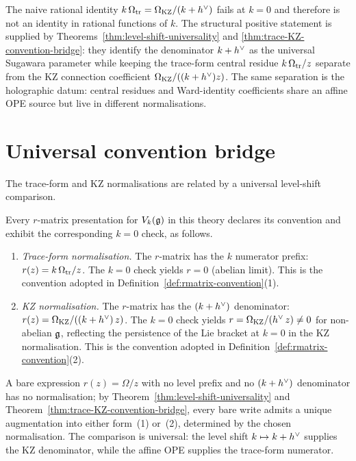 \begin{remark}
\label{rem:chern-weil-474}
The naive rational identity
$k\,\Omega_{\mathrm{tr}} = \Omega_{\mathrm{KZ}}/(k + h^{\vee})$ fails at $k = 0$ and therefore is
not an identity in rational functions of $k$. The structural positive
statement is supplied by
Theorems~\ref{thm:level-shift-universality} and
\ref{thm:trace-KZ-convention-bridge}: they identify the denominator
$k + h^{\vee}$ as the universal Sugawara parameter while keeping the
trace-form central residue $k\,\Omega_{\mathrm{tr}}/z$ separate from the KZ
connection coefficient $\Omega_{\mathrm{KZ}}/((k+h^{\vee})z)$. The same separation is
the holographic datum: central residues and Ward-identity coefficients
share an affine OPE source but live in different normalisations.
\end{remark}

\section{Universal convention bridge}
\label{sec:level-shift-convention-bridge}

The trace-form and KZ normalisations are related by a universal
level-shift comparison.

\begin{corollary}[$r$-matrix convention bridge with explicit $k=0$ check]
\label{cor:level-shift-universal-convention-bridge}
\ClaimStatusProvedHere
Every $r$-matrix presentation for $V_k(\mathfrak{g})$ in this theory declares
its convention and exhibit the corresponding $k = 0$ check, as follows.
\begin{enumerate}
 \item \emph{Trace-form normalisation.} The $r$-matrix has the
 $k$ numerator prefix:
 $r(z) = k\,\Omega_{\mathrm{tr}} / z$. The $k = 0$ check yields $r = 0$
 (abelian limit). This is the convention adopted in
 Definition~\ref{def:rmatrix-convention}(1).
 \item \emph{KZ normalisation.} The $r$-matrix has the
 $(k + h^{\vee})$ denominator:
 $r(z) = \Omega_{\mathrm{KZ}} / ((k + h^{\vee})\,z)$. The $k = 0$ check yields
 $r = \Omega_{\mathrm{KZ}} / (h^{\vee}\,z) \neq 0$ for non-abelian $\mathfrak{g}$, reflecting
 the persistence of the Lie bracket at $k = 0$ in the KZ
 normalisation. This is the convention adopted in
 Definition~\ref{def:rmatrix-convention}(2).
\end{enumerate}
A bare expression $r(z) = \Omega/z$ with no level prefix and no
$(k + h^{\vee})$ denominator has no normalisation; by
Theorem~\ref{thm:level-shift-universality} and
Theorem~\ref{thm:trace-KZ-convention-bridge}, every bare write admits
a unique augmentation into either form~(1) or~(2), determined by the
chosen normalisation. The comparison is universal: the level shift
$k \mapsto k + h^{\vee}$ supplies the KZ
denominator, while the affine OPE supplies the trace-form numerator.
\end{corollary}

